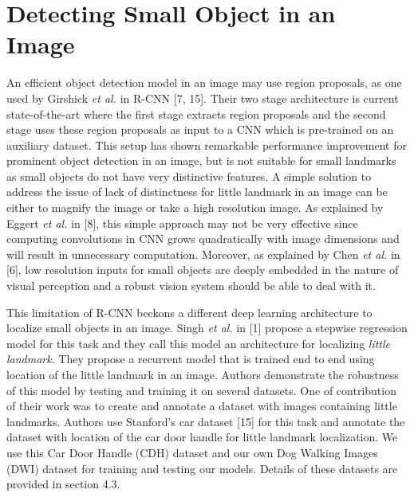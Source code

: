 \documentclass [11pt,letterpaper ,twoside ,openany ]{report}
\begin{document}
    \chapter{Detecting Small Object in an Image}
    \doublespacing
    An efficient object detection model in an image may use region proposals, as  one used by Girshick \textit {et al.} in R-CNN [7, 15]. Their two stage architecture is current state-of-the-art where the first stage extracts region proposals and the second stage uses these region proposals as input to a CNN which is pre-trained on an auxiliary dataset. This setup has shown remarkable performance improvement for prominent object detection in an image, but is not suitable for small landmarks as small objects do not have very distinctive features. A simple solution to address the issue of lack of distinctness for little landmark in an image can be either to magnify the image or take a high resolution image. As explained by Eggert \textit {et al.} in [8], this simple approach may not be very effective since computing convolutions in CNN grows quadratically with image dimensions and will result in unnecessary computation. Moreover, as explained by Chen \textit {et al.} in [6], low resolution inputs for small objects are deeply embedded  in the nature of visual perception and a robust vision system should be able to deal with it.
        
    This limitation of R-CNN beckons a different deep learning architecture to localize small objects in an image. Singh \textit {et al.} in [1] propose a stepwise regression model for this task and they call this model an architecture for localizing \textit {little landmark}. They propose a recurrent model that is trained end to end using location of the little landmark in an image. Authors demonstrate the robustness of this model by testing and training it on several datasets. One of contribution of their work was to create and annotate a dataset with images containing little landmarks. Authors use Stanford's car dataset [15] for this task and annotate the dataset with location of the car door handle for little landmark localization. We use this Car Door Handle (CDH) dataset and our own Dog Walking Images (DWI) dataset for training and testing our models. Details of these datasets are provided in section 4.3.
\end{document}
